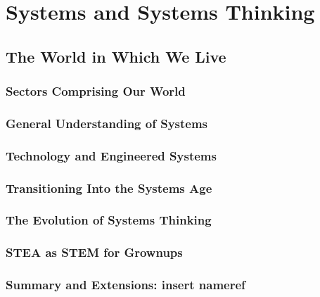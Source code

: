 \documentclass[11pt,fleqn]{book} %
\begin{document}
	
\newcommand{\subtitle}{Doctor Wolter J Fabrycky}






\part{Systems and Systems Thinking}

  \chapter{The World in Which We Live}
    \section{Sectors Comprising Our World}
      \label{sec:sectors-comprising-our}
    \section{General Understanding of Systems}
    \section{Technology and Engineered Systems}
    \section{Transitioning Into the Systems Age}
    \section{The Evolution of Systems Thinking}
    \section{STEA as STEM for Grownups}
    \section{Summary and Extensions: insert nameref}	%
\end{document}
